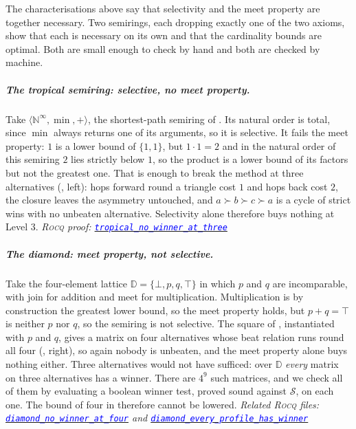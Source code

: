\documentclass[a4paper,UKenglish,cleveref,autoref,thm-restate,anonymous]{lipics-v2021}
\newcommand{\rocq}{\textsc{Rocq}}
\newcommand{\Diam}{\mathbb{D}}
\newcommand{\anonrepo}{https://anonymous.4open.science/r/Semiring_graph_algorithm-000E}
\newcommand{\rocqfile}[2]{\href{\anonrepo/#1}{\textcolor{blue}{\texttt{#2}}}}
\newcommand{\proofat}[2]{{\footnotesize\itshape\rocq{} proof: \rocqfile{#1}{#2}}}
\newcommand{\rocqrelated}[1]{{\footnotesize\itshape Related \rocq{} files: #1}}
\begin{document}
The characterisations above say that selectivity and the meet property are
together necessary. Two semirings, each dropping exactly one of the two
axioms, show that each is necessary on its own and that the cardinality
bounds are optimal. Both are small enough to check by hand and both are
checked by machine.

\subparagraph*{The tropical semiring: selective, no meet property.}
Take $\langle \mathbb{N}^{\infty}, \min, +\rangle$, the shortest-path
semiring of . Its natural order is total, since $\min$
always returns one of its arguments, so it is selective. It fails the meet
property: $1$ is a lower bound of $\{1, 1\}$, but $1 \cdot 1 = 2$ and in
the natural order of this semiring $2$ lies strictly below $1$, so the
product is a lower bound of its factors but not the greatest one. That is
enough to break the method at three alternatives
(, left): hops forward round a triangle cost $1$ and
hops back cost $2$, the closure leaves the asymmetry untouched, and
$a \succ b \succ c \succ a$ is a cycle of strict wins with no unbeaten
alternative. Selectivity alone therefore buys nothing at Level 3.
\proofat{examples/SharpnessWitness.v}{tropical\_no\_winner\_at\_three}

\subparagraph*{The diamond: meet property, not selective.}
Take the four-element lattice $\Diam = \{\bot, p, q, \top\}$ in which $p$
and $q$ are incomparable, with join for addition and meet for
multiplication. Multiplication is by construction the greatest lower
bound, so the meet property holds, but $p + q = \top$ is neither $p$ nor
$q$, so the semiring is not selective. The square of ,
instantiated with $p$ and $q$, gives a matrix on four alternatives whose
beat relation runs round all four (, right), so again
nobody is unbeaten, and the meet property alone buys nothing either.
Three alternatives would not have sufficed: over $\Diam$ \emph{every}
matrix on three alternatives has a winner. There are $4^{9}$ such
matrices, and we check all of them by evaluating a boolean winner test,
proved sound against $\mathcal{S}$, on each one. The bound of four in
 therefore cannot be lowered.
\rocqrelated{\rocqfile{examples/SharpnessWitness.v}{diamond\_no\_winner\_at\_four} and
\rocqfile{examples/SharpnessWitness.v}{diamond\_every\_profile\_has\_winner}}
\end{document}
